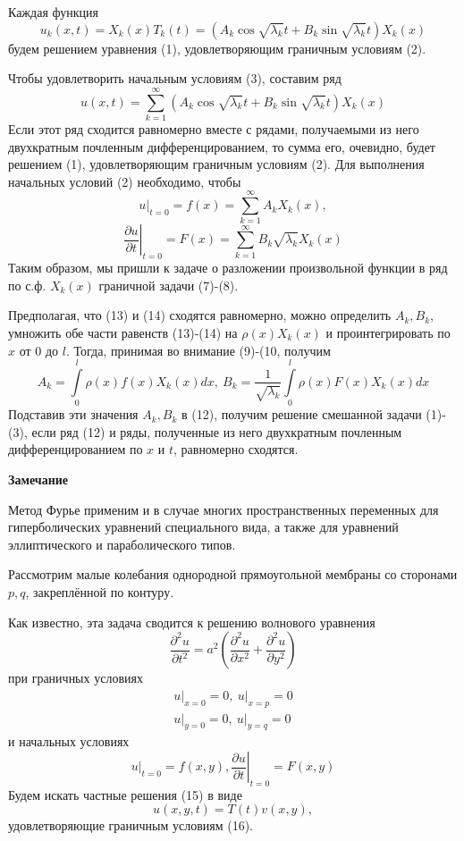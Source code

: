 \begin{enumerate}
Каждая функция
\[
	u_k(x,t) = X_k(x) T_k(t) = \left( A_k \cos \sqrt{\lambda_k} t + B_k \sin \sqrt{\lambda_k} t\right)X_k (x)
\]
будем решением уравнения (1), удовлетворяющим граничным условиям (2).

Чтобы удовлетворить начальным условиям (3), составим ряд
\[
	u(x,t) = \sum_{k=1}^\infty \left( A_k \cos \sqrt{\lambda_k} t + B_k \sin \sqrt{\lambda_k} t\right) X_k (x)\tag{12}
\]
Если этот ряд сходится равномерно вместе с рядами, получаемыми из него двухкратным почленным дифференцированием, то сумма его, очевидно, будет решением (1), удовлетворяющим граничным условиям (2). Для выполнения начальных условий (2) необходимо, чтобы
\[
	\left. u\right|_{t=0} = f(x) = \sum_{k=1}^\infty A_k X_k (x), \tag{13}
\]
\[
	\left. \frac{\partial u}{\partial t}\right|_{t=0} = F(x) = \sum_{k=1}^\infty B_k \sqrt{\lambda_k} X_k (x) \tag{14}
\]
Таким образом, мы пришли к задаче о разложении произвольной функции в ряд по с.ф. $X_k(x)$ граничной задачи (7)-(8).

Предполагая, что (13) и (14) сходятся равномерно, можно определить $A_k, B_k$, умножить обе части равенств (13)-(14) на $\rho(x) X_k(x)$ и проинтегрировать по $x$ от $0$ до $l$. Тогда, принимая во внимание (9)-(10, получим
\[
	A_k = \int\limits_0^l \rho(x) f(x) X_k (x) dx, ~ B_k = \frac{1}{\sqrt{\lambda_k}} \int\limits_0^l \rho(x) F(x) X_k(x)dx
\]
Подставив эти значения $A_k, B_k$ в (12), получим решение смешанной задачи (1)-(3), если ряд (12) и ряды, полученные из него двухкратным почленным дифференцированием по $x$ и $t$, равномерно сходятся.

\textbf{Замечание}

Метод Фурье применим и в случае многих пространственных переменных для гиперболических уравнений специального вида, а также для уравнений эллиптического и параболического типов.

Рассмотрим малые колебания однородной прямоугольной мембраны со сторонами $p, q$, закреплённой по контуру.

Как известно, эта задача сводится к решению волнового уравнения
\[
	\frac{\partial^2 u}{\partial t^2} = a^2 \left( \frac{\partial^2 u}{\partial x^2} + \frac{\partial^2 u}{\partial y^2}\right) \tag{15}
\]
при граничных условиях
\[
	\begin{aligned}
		\left. u\right|_{x=0} = 0, ~ \left. u\right|_{x=p} = 0 \\
				\left. u\right|_{y=0} = 0, ~ \left. u\right|_{y=q} = 0
					\end{aligned} \tag{16}
\]
и начальных условиях
\[
	\left. u\right|_{t=0} = f(x,y), \left. \frac{\partial u}{\partial t}\right|_{t=0} = F(x,y) \tag{17}
\]
Будем искать частные решения (15) в виде
\[
	u(x,y,t) = T(t) v(x,y), \tag{18}
\]
удовлетворяющие граничным условиям (16).


\end{enumerate}
